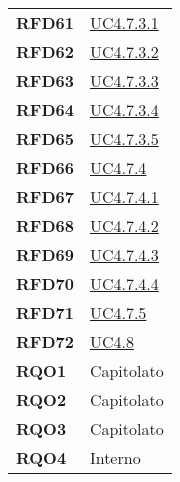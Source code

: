 \begin{longtable}[H]{>{\centering\bfseries}m{8cm} >{\centering\arraybackslash}m{8cm}}
    RFD61
    
    &   \hyperref[spar:uc4.7.3.1]{UC4.7.3.1} \\

    RFD62
  
    &   \hyperref[spar:uc4.7.3.2]{UC4.7.3.2} \\

    RFD63
  
    &   \hyperref[spar:uc4.7.3.3]{UC4.7.3.3} \\

    RFD64

    &   \hyperref[spar:uc4.7.3.4]{UC4.7.3.4} \\

    RFD65
  
    &   \hyperref[spar:uc4.7.3.5]{UC4.7.3.5} \\

    RFD66
   
    &   \hyperref[par:uc4.7.4]{UC4.7.4} \\

    RFD67

    &   \hyperref[spar:uc4.7.4.1]{UC4.7.4.1} \\


    RFD68

    &   \hyperref[spar:uc4.7.4.2]{UC4.7.4.2} \\

    RFD69
 
    &   \hyperref[spar:uc4.7.4.3]{UC4.7.4.3} \\

    RFD70

    &   \hyperref[spar:uc4.7.4.4]{UC4.7.4.4} \\

    RFD71

    &   \hyperref[par:uc4.7.5]{UC4.7.5} \\

    RFD72
    &   \hyperref[ssub:uc4.8]{UC4.8} \\

    RQO1
    & Capitolato \\

    RQO2

    & Capitolato \\

    RQO3

        & Capitolato \\

    RQO4
    
        & Interno \\


\end{longtable}
